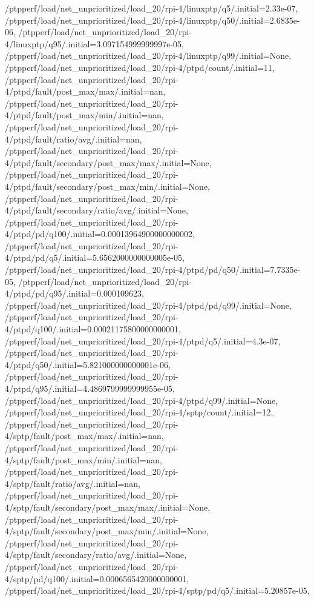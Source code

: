 {    /ptpperf/load/net_unprioritized/load_20/rpi-4/linuxptp/q5/.initial=2.33e-07,
    /ptpperf/load/net_unprioritized/load_20/rpi-4/linuxptp/q50/.initial=2.6835e-06,
    /ptpperf/load/net_unprioritized/load_20/rpi-4/linuxptp/q95/.initial=3.097154999999997e-05,
    /ptpperf/load/net_unprioritized/load_20/rpi-4/linuxptp/q99/.initial=None,
    /ptpperf/load/net_unprioritized/load_20/rpi-4/ptpd/count/.initial=11,
    /ptpperf/load/net_unprioritized/load_20/rpi-4/ptpd/fault/post_max/max/.initial=nan,
    /ptpperf/load/net_unprioritized/load_20/rpi-4/ptpd/fault/post_max/min/.initial=nan,
    /ptpperf/load/net_unprioritized/load_20/rpi-4/ptpd/fault/ratio/avg/.initial=nan,
    /ptpperf/load/net_unprioritized/load_20/rpi-4/ptpd/fault/secondary/post_max/max/.initial=None,
    /ptpperf/load/net_unprioritized/load_20/rpi-4/ptpd/fault/secondary/post_max/min/.initial=None,
    /ptpperf/load/net_unprioritized/load_20/rpi-4/ptpd/fault/secondary/ratio/avg/.initial=None,
    /ptpperf/load/net_unprioritized/load_20/rpi-4/ptpd/pd/q100/.initial=0.00013964900000000002,
    /ptpperf/load/net_unprioritized/load_20/rpi-4/ptpd/pd/q5/.initial=5.6562000000000005e-05,
    /ptpperf/load/net_unprioritized/load_20/rpi-4/ptpd/pd/q50/.initial=7.7335e-05,
    /ptpperf/load/net_unprioritized/load_20/rpi-4/ptpd/pd/q95/.initial=0.000109623,
    /ptpperf/load/net_unprioritized/load_20/rpi-4/ptpd/pd/q99/.initial=None,
    /ptpperf/load/net_unprioritized/load_20/rpi-4/ptpd/q100/.initial=0.00021175800000000001,
    /ptpperf/load/net_unprioritized/load_20/rpi-4/ptpd/q5/.initial=4.3e-07,
    /ptpperf/load/net_unprioritized/load_20/rpi-4/ptpd/q50/.initial=5.821000000000001e-06,
    /ptpperf/load/net_unprioritized/load_20/rpi-4/ptpd/q95/.initial=4.4869799999999955e-05,
    /ptpperf/load/net_unprioritized/load_20/rpi-4/ptpd/q99/.initial=None,
    /ptpperf/load/net_unprioritized/load_20/rpi-4/sptp/count/.initial=12,
    /ptpperf/load/net_unprioritized/load_20/rpi-4/sptp/fault/post_max/max/.initial=nan,
    /ptpperf/load/net_unprioritized/load_20/rpi-4/sptp/fault/post_max/min/.initial=nan,
    /ptpperf/load/net_unprioritized/load_20/rpi-4/sptp/fault/ratio/avg/.initial=nan,
    /ptpperf/load/net_unprioritized/load_20/rpi-4/sptp/fault/secondary/post_max/max/.initial=None,
    /ptpperf/load/net_unprioritized/load_20/rpi-4/sptp/fault/secondary/post_max/min/.initial=None,
    /ptpperf/load/net_unprioritized/load_20/rpi-4/sptp/fault/secondary/ratio/avg/.initial=None,
    /ptpperf/load/net_unprioritized/load_20/rpi-4/sptp/pd/q100/.initial=0.0006565420000000001,
    /ptpperf/load/net_unprioritized/load_20/rpi-4/sptp/pd/q5/.initial=5.20857e-05,
}
